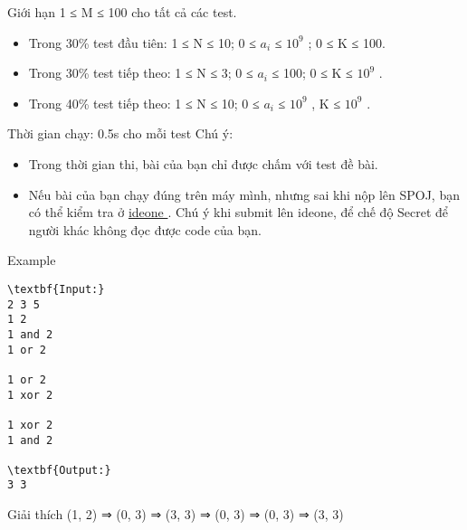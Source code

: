Giới hạn    
1 ≤ M ≤ 100 cho tất cả các test.  
\begin{itemize}
	\item      Trong 30\% test đầu tiên: 1 ≤ N ≤ 10; 0 ≤ $a_{i}$     ≤ $10^{9}$     ; 0 ≤ K ≤ 100.    
	\item      Trong 30\% test tiếp theo: 1 ≤ N ≤ 3; 0 ≤ $a_{i}$     ≤ 100; 0 ≤ K ≤ $10^{9}$     .    
	\item      Trong 40\% test tiếp theo: 1 ≤ N ≤ 10; 0 ≤ $a_{i}$      ≤ $10^{9}$     , K ≤ $10^{9}$     .    
\end{itemize}

   Thời gian chạy: 0.5s cho mỗi test
   Chú ý:  
\begin{itemize}
	\item     Trong thời gian thi, bài của bạn chỉ được chấm với test đề bài.   
	\item     Nếu bài của bạn chạy đúng trên máy mình, nhưng sai khi nộp lên SPOJ, bạn có thể kiểm tra ở    \href{https://ideone.com}{     ideone    }    . Chú ý khi submit lên ideone, để chế độ Secret để người khác không đọc được code của bạn.   
\end{itemize}
   Example  
\begin{verbatim}
\textbf{Input:}
2 3 5
1 2
1 and 2
1 or 2

1 or 2
1 xor 2

1 xor 2
1 and 2 

\textbf{Output:}
3 3
\end{verbatim}
     Giải thích    
(1, 2) ⇒ (0, 3) ⇒ (3, 3) ⇒ (0, 3) ⇒ (0, 3) ⇒ (3, 3)